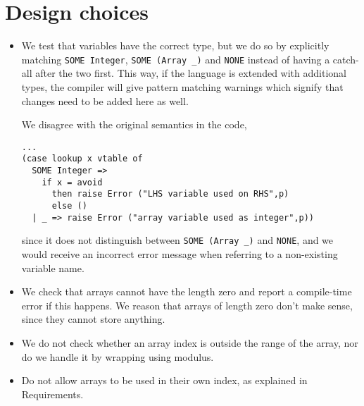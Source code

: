 \section{Design choices}

\begin{itemize}
  \item We test that variables have the correct type, but we do so by
  explicitly matching \verb+SOME Integer+, \verb+SOME (Array _)+ and
  \verb+NONE+ instead of having a catch-all after the two first. This way, if
  the language is extended with additional types, the compiler will give
  pattern matching warnings which signify that changes need to be added here as
  well.

  We disagree with the original semantics in the code,
\begin{verbatim}
...
(case lookup x vtable of
  SOME Integer =>
    if x = avoid
      then raise Error ("LHS variable used on RHS",p)
      else ()
  | _ => raise Error ("array variable used as integer",p))
\end{verbatim}

since it does not distinguish between \verb+SOME (Array _)+ and \verb+NONE+,
and we would receive an incorrect error message when referring to a non-existing
variable name.

  \item We check that arrays cannot have the length zero and report a
  compile-time error if this happens. We reason that arrays of length zero don't
  make sense, since they cannot store anything.

  \item We do not check whether an array index is outside the range of the
        array, nor do we handle it by wrapping using modulus.

  \item Do not allow arrays to be used in their own index, as explained in
        Requirements.


 
\end{itemize}

